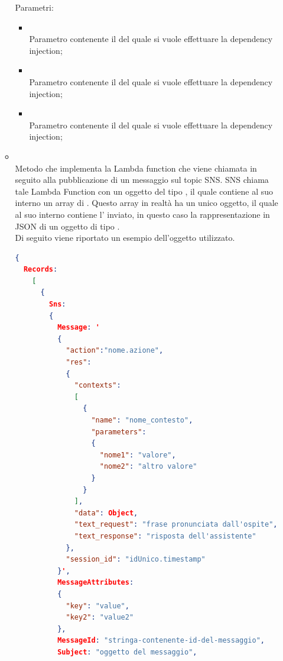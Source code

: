 \begin{itemize}
\begin{itemize}
		Parametri:
		\begin{itemize}
			\item {} \\
			Parametro contenente il  del quale si vuole effettuare la dependency injection;
			\item {} \\
			Parametro contenente il  del quale si vuole effettuare la dependency injection;
			\item {} \\
			Parametro contenente il  del quale si vuole effettuare la dependency injection;
		\end{itemize}
		\item[]  \\		Metodo che implementa la Lambda function che viene chiamata in seguito alla pubblicazione di un messaggio sul topic SNS. SNS chiama tale Lambda Function con un oggetto del tipo , il quale contiene al suo interno un array di . Questo array in realtà ha un unico oggetto, il quale al suo interno contiene l' inviato, in questo caso la rappresentazione in JSON di un oggetto di tipo . \\
		Di seguito viene riportato un esempio dell'oggetto utilizzato.
\begin{lstlisting}[language=json,firstnumber=1]
  {
  Records:
    [
      {
        Sns:
        {
          Message: '
          {
            "action":"nome.azione",
            "res":
            {
              "contexts":
              [
                {
                  "name": "nome_contesto",
                  "parameters":
                  {
                    "nome1": "valore",
                    "nome2": "altro valore"
                  }
                }
              ],
              "data": Object,
              "text_request": "frase pronunciata dall'ospite",
              "text_response": "risposta dell'assistente"
            },
            "session_id": "idUnico.timestamp"
          }',
          MessageAttributes:
          {
            "key": "value",
            "key2": "value2"
          },
          MessageId: "stringa-contenente-id-del-messaggio",
          Subject: "oggetto del messaggio",

\end{lstlisting}
\end{itemize}
\end{itemize}
